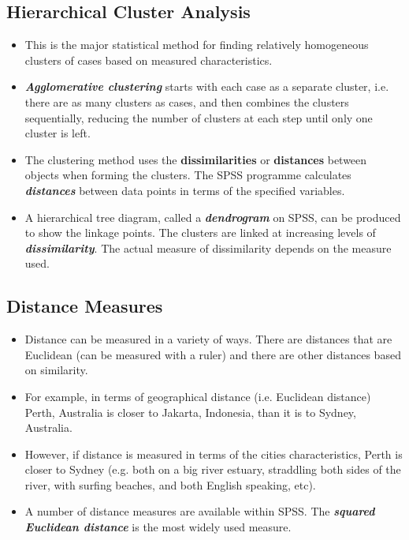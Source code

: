 \subsection{Hierarchical Cluster Analysis}
\begin{itemize}
	\item This is the major statistical method for finding relatively homogeneous clusters of cases based on measured characteristics.
	
\item \textbf{\textit{Agglomerative clustering}} starts with each case as a separate cluster, i.e. there are as many clusters as cases, and then combines the clusters sequentially, reducing the number of clusters at each step until only one cluster is left.
	
\item The clustering method uses the \textbf{dissimilarities} or \textbf{distances} between objects when forming the clusters. The SPSS programme calculates \textbf{\textit{distances}} between data points in terms of the specified variables.
	
\item A hierarchical tree diagram, called a \textbf{\textit{dendrogram }} on SPSS, can be produced to show the linkage points. The clusters are linked at increasing levels of \textbf{\textit{dissimilarity}}.
	The actual measure of dissimilarity depends on the measure used.
	
\end{itemize}


\subsection{Distance Measures}
\begin{itemize}
	\item Distance can be measured in a variety of ways. There are distances that are Euclidean (can be measured with a ruler) and there are other distances based on similarity.
	\item  For example, in terms of
	geographical distance (i.e. Euclidean distance) Perth, Australia is closer to Jakarta, Indonesia, than it is to Sydney, Australia.
	
\item However, if distance is measured in terms of the cities characteristics, Perth is closer to Sydney (e.g. both on a big river estuary, straddling both sides of the river, with surfing beaches, and both English speaking, etc). 
\item A number of distance measures are available within SPSS. The \textbf{\textit{squared Euclidean distance}} is the most widely used measure.
\end{itemize}



